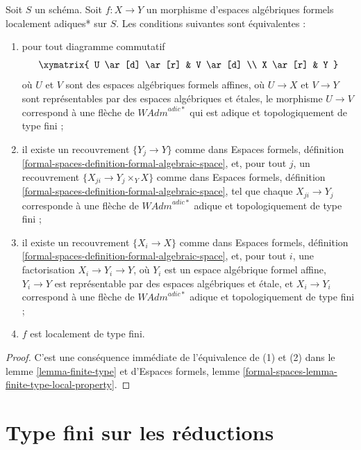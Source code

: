 \begin{lemma}
\label{lemma-finite-type-morphisms}
Soit $S$ un schéma. Soit $f : X \to Y$ un morphisme d'espaces algébriques
formels localement adiques* sur $S$. Les conditions suivantes sont
équivalentes :
\begin{enumerate}
\item pour tout diagramme commutatif
$$
\xymatrix{
U \ar[d] \ar[r] & V \ar[d] \\
X \ar[r] & Y
}
$$
où $U$ et $V$ sont des espaces algébriques formels affines, où $U \to X$ et
$V \to Y$ sont représentables par des espaces algébriques et étales, le
morphisme $U \to V$ correspond à une flèche de $\textit{WAdm}^{adic*}$ qui est
adique et topologiquement de type fini ;
\item il existe un recouvrement $\{Y_j \to Y\}$ comme dans Espaces formels,
définition \ref{formal-spaces-definition-formal-algebraic-space}, et, pour tout
$j$, un recouvrement $\{X_{ji} \to Y_j \times_Y X\}$ comme dans Espaces
formels, définition \ref{formal-spaces-definition-formal-algebraic-space}, tel
que chaque $X_{ji} \to Y_j$ corresponde à une flèche de
$\textit{WAdm}^{adic*}$ adique et topologiquement de type fini ;
\item il existe un recouvrement $\{X_i \to X\}$ comme dans Espaces formels,
définition \ref{formal-spaces-definition-formal-algebraic-space}, et, pour tout
$i$, une factorisation $X_i \to Y_i \to Y$, où $Y_i$ est un espace algébrique
formel affine, $Y_i \to Y$ est représentable par des espaces algébriques et
étale, et $X_i \to Y_i$ correspond à une flèche de
$\textit{WAdm}^{adic*}$ adique et topologiquement de type fini ;
\item $f$ est localement de type fini.
\end{enumerate}
\end{lemma}

\begin{proof}
C'est une conséquence immédiate de l'équivalence de (1) et (2) dans le lemme
\ref{lemma-finite-type} et d'Espaces formels, lemme
\ref{formal-spaces-lemma-finite-type-local-property}.
\end{proof}










\section{Type fini sur les réductions}
\label{section-finite-type-red}

